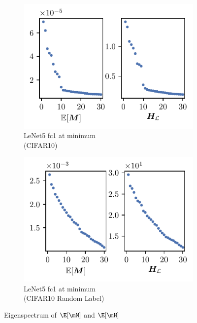 \begin{figure}[th]
\begin{subfigure}[b]{0.32\textwidth}
        \includegraphics[width=\textwidth]{Figures/EM_vs_H/LeNet5_fixlr0.01/UTAU_vs_full_sigval_d30_CIFAR10_Exp1_LeNet5_fixlr0.01R1_E-1_fc1.pdf}
        \caption{LeNet5 fc1 at minimum\\(CIFAR10)}
        \label{fig:UTAU_H_spec_Lenet}
    \end{subfigure}\hfill
    \begin{subfigure}[b]{0.32\textwidth}
        \centering
        \captionsetup{justification=centering}
        \includegraphics[width=\textwidth]{Figures/EM_vs_H/LeNet5_RL/UTAU_vs_full_sigval_d30_CIFAR10_RandomLabel_LeNet5_fixlr0.01_RLR4_E-1_fc1.pdf}
        \caption{LeNet5 fc1 at minimum\\(CIFAR10 Random Label)}
        \label{fig:UTAU_H_spec_RL}
    \end{subfigure}
    \captionsetup{justification=centering}
    \caption{Eigenspectrum of $\E[\mM]$ and $\E[\mH]$}
    \label{fig:UTAU_H_spec}
\end{figure}

